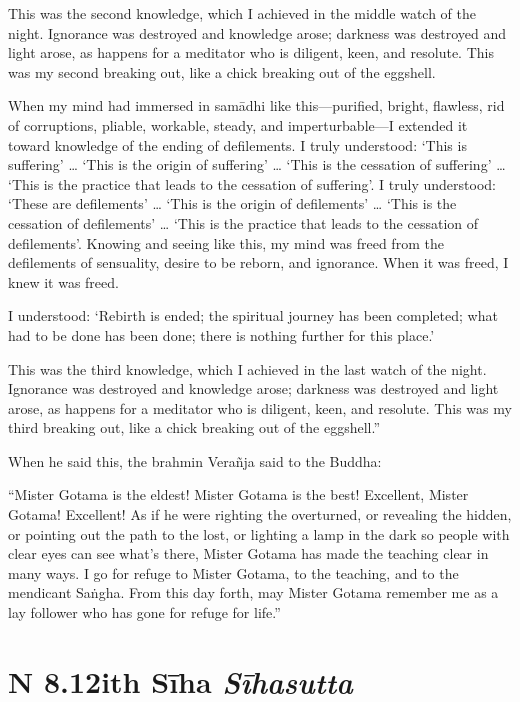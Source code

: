 \documentclass[12pt,openany]{book}%
\newcommand*{\suttatitleacronym}[1]{\smaller[2]{#1}\vspace*{.3em}}
\newcommand*{\suttatitletranslation}[1]{\linebreak{#1}}
\newcommand*{\suttatitleroot}[1]{\linebreak\smaller[2]\itshape{#1}}
\newcommand*{\tocacronym}[1]{\hspace*{-3.3em}{#1}\quad}
\newcommand*{\toctranslation}[1]{#1}
\newcommand*{\tocroot}[1]{(\textit{#1})}
\begin{document}
This was the second knowledge, which I achieved in the middle watch of the night. Ignorance was destroyed and knowledge arose; darkness was destroyed and light arose, as happens for a meditator who is diligent, keen, and resolute. This was my second breaking out, like a chick breaking out of the eggshell. 

When my mind had immersed in \textsanskrit{samādhi} like this—purified, bright, flawless, rid of corruptions, pliable, workable, steady, and imperturbable—I extended it toward knowledge of the ending of defilements. I truly understood: ‘This is suffering’ … ‘This is the origin of suffering’ … ‘This is the cessation of suffering’ … ‘This is the practice that leads to the cessation of suffering’. I truly understood: ‘These are defilements’ … ‘This is the origin of defilements’ … ‘This is the cessation of defilements’ … ‘This is the practice that leads to the cessation of defilements’. Knowing and seeing like this, my mind was freed from the defilements of sensuality, desire to be reborn, and ignorance. When it was freed, I knew it was freed. 

I understood: ‘Rebirth is ended; the spiritual journey has been completed; what had to be done has been done; there is nothing further for this place.’ 

This was the third knowledge, which I achieved in the last watch of the night. Ignorance was destroyed and knowledge arose; darkness was destroyed and light arose, as happens for a meditator who is diligent, keen, and resolute. This was my third breaking out, like a chick breaking out of the eggshell.” 

When he said this, the brahmin \textsanskrit{Verañja} said to the Buddha: 

“Mister Gotama is the eldest! Mister Gotama is the best! Excellent, Mister Gotama! Excellent! As if he were righting the overturned, or revealing the hidden, or pointing out the path to the lost, or lighting a lamp in the dark so people with clear eyes can see what’s there, Mister Gotama has made the teaching clear in many ways. I go for refuge to Mister Gotama, to the teaching, and to the mendicant \textsanskrit{Saṅgha}. From this day forth, may Mister Gotama remember me as a lay follower who has gone for refuge for life.” 

%
\section*{{\suttatitleacronym AN 8.12}{\suttatitletranslation With Sīha }{\suttatitleroot Sīhasutta}}
\addcontentsline{toc}{section}{\tocacronym{AN 8.12} \toctranslation{With Sīha } \tocroot{Sīhasutta}}
\end{document}
